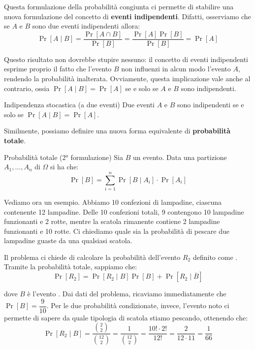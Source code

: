 \documentclass[a4paper, 12pt]{report}
\begin{document}
    Questa formulazione della probabilità congiunta ci permette di stabilire una nuova formulazione del concetto di \textbf{eventi indipendenti}. Difatti, osserviamo che se $A$ e $B$ sono due eventi indipendenti allora:
    \[\Pr[A \mid B] = \frac{\Pr[A \cap B]}{\Pr[B]} = \frac{\Pr[A] \Pr[B]}{\Pr[B]} = \Pr[A]\]

    Questo risultato non dovrebbe stupire nessuno: il concetto di eventi indipendenti esprime proprio il fatto che l'evento $B$ non influenzi in alcun modo l'evento $A$, rendendo la probabilità inalterata. Ovviamente, questa implicazione vale anche al contrario, ossia $\Pr[A \mid B] = \Pr[A]$ se e solo se $A$ e $B$ sono indipendenti.

    \begin{framedprop}{Indipendenza stocastica (a due eventi)}
        Due eventi $A$ e $B$ sono indipendenti se e solo se $\Pr[A \mid B] = \Pr[A]$.
    \end{framedprop}
    
    Similmente, possiamo definire una nuova forma equivalente di \textbf{probabilità totale}.
    
    \begin{framedprop}{Probabilità totale (2° formulazione)}
        Sia $B$ un evento. Data una partizione $A_1, \ldots, A_n$ di $\Omega$ si ha che:
        \[\Pr[B] = \sum_{i = 1}^n \Pr[B \mid A_i] \cdot \Pr[A_i]\]
    \end{framedprop}
    
    Vediamo ora un esempio. Abbiamo 10 confezioni di lampadine, ciascuna contenente 12 lampadine. Delle 10 confezioni totali, 9 contengono 10 lampadine funzionanti e 2 rotte, mentre la scatola rimanente contiene 2 lampadine funzionanti e 10 rotte. Ci chiediamo quale sia la probabilità di pescare due lampadine guaste da una qualsiasi scatola.
    
    Il problema ci chiede di calcolare la probabilità dell'evento $R_2$ definito come . Tramite la probabilità totale, sappiamo che:
    \[\Pr[R_2] = \Pr[R_2 \mid B] \Pr[B] + \Pr[R_2 \mid \overline{B}]\]

    dove $B$ è l'evento . Dai dati del problema, ricaviamo immediatamente che $\Pr[B] = \dfrac{9}{10}$. Per le due probabilità condizionate, invece, l'evento noto ci permette di sapere da quale tipologia di scatola stiamo pescando, ottenendo che:
    \[ \Pr[R_2  \mid  B] = \frac{\binom{2}{2}}{\binom{12}{2}} = \frac{1}{\binom{12}{2}} = \frac{10! \cdot 2!}{12!} = \frac{2}{12 \cdot 11}=\frac{1}{66}\]
    
\end{document}
